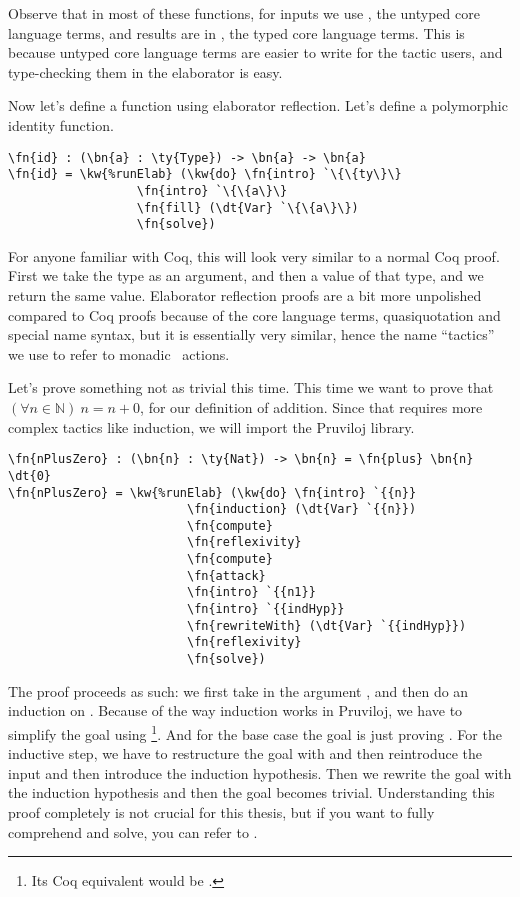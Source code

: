 Observe that in most of these functions, for inputs we use , the
untyped core language terms, and results are in , the typed core
language terms.  This is because untyped core language terms are easier to
write for the tactic users, and type-checking them in the elaborator is easy.

Now let's define a function using elaborator reflection.
Let's define a polymorphic identity function.

\begin{Verbatim}[framesep=2mm, label=\footnotesize{\normalfont{Idris}}, labelposition=topline]
\fn{id} : (\bn{a} : \ty{Type}) -> \bn{a} -> \bn{a}
\fn{id} = \kw{%runElab} (\kw{do} \fn{intro} `\{\{ty\}\}
                  \fn{intro} `\{\{a\}\}
                  \fn{fill} (\dt{Var} `\{\{a\}\})
                  \fn{solve})
\end{Verbatim}

For anyone familiar with Coq, this will look very similar to a normal Coq
proof. First we take the type as an argument, and then a value of that type,
and we return the same value. Elaborator reflection proofs are a bit more
unpolished compared to Coq proofs because of the core language terms,
quasiquotation and special name syntax, but it is essentially very similar,
hence the name ``tactics'' we use to refer to monadic \Elab\ actions.

Let's prove something not as trivial this time. This time we want to prove that
$(\forall n \in \mathbb{N})\ n = n + 0$, for our definition of addition. Since that requires more complex tactics like induction, we will import the Pruviloj library.\cite{davidphd}

\begin{Verbatim}[framesep=2mm, label=\footnotesize{\normalfont{Idris}}, labelposition=topline]
\fn{nPlusZero} : (\bn{n} : \ty{Nat}) -> \bn{n} = \fn{plus} \bn{n} \dt{0}
\fn{nPlusZero} = \kw{%runElab} (\kw{do} \fn{intro} `{{n}}
                         \fn{induction} (\dt{Var} `{{n}})
                         \fn{compute}
                         \fn{reflexivity}
                         \fn{compute}
                         \fn{attack}
                         \fn{intro} `{{n1}}
                         \fn{intro} `{{indHyp}}
                         \fn{rewriteWith} (\dt{Var} `{{indHyp}})
                         \fn{reflexivity}
                         \fn{solve})
\end{Verbatim}

The proof proceeds as such: we first take in the argument , and then do
an induction on . Because of the way induction works in Pruviloj, we have
to simplify the goal using \footnote{Its Coq equivalent would be
.}.
And for the base case the goal is just proving  \dt{=} .
For the inductive step, we have to restructure the goal with  and
then reintroduce the input and then introduce the induction hypothesis. Then we
rewrite the goal with the induction hypothesis and then the goal becomes
trivial. Understanding this proof completely is not crucial for this thesis,
but if you want to fully comprehend  and {solve}, you can refer to
\cite{elabref}.

